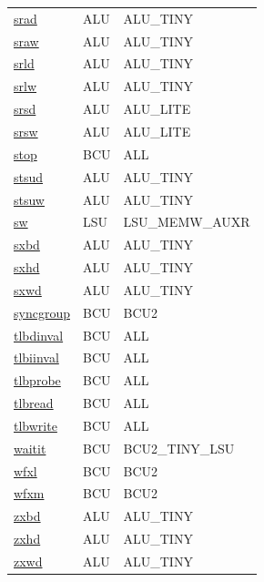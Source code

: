 \begin{small}
\begin{longtable}[l]{l l l}
\hyperlink{lvx.srad}{srad} & ALU & ALU\_TINY \\ 
\hyperlink{lvx.sraw}{sraw} & ALU & ALU\_TINY \\ 
\hyperlink{lvx.srld}{srld} & ALU & ALU\_TINY \\ 
\hyperlink{lvx.srlw}{srlw} & ALU & ALU\_TINY \\ 
\hyperlink{lvx.srsd}{srsd} & ALU & ALU\_LITE \\ 
\hyperlink{lvx.srsw}{srsw} & ALU & ALU\_LITE \\ 
\hyperlink{lvx.stop}{stop} & BCU & ALL \\ 
\hyperlink{lvx.stsud}{stsud} & ALU & ALU\_TINY \\ 
\hyperlink{lvx.stsuw}{stsuw} & ALU & ALU\_TINY \\ 
\hyperlink{lvx.sw}{sw} & LSU & LSU\_MEMW\_AUXR \\ 
\hyperlink{lvx.sxbd}{sxbd} & ALU & ALU\_TINY \\ 
\hyperlink{lvx.sxhd}{sxhd} & ALU & ALU\_TINY \\ 
\hyperlink{lvx.sxwd}{sxwd} & ALU & ALU\_TINY \\ 
\hyperlink{lvx.syncgroup}{syncgroup} & BCU & BCU2 \\ 
\hyperlink{lvx.tlbdinval}{tlbdinval} & BCU & ALL \\ 
\hyperlink{lvx.tlbiinval}{tlbiinval} & BCU & ALL \\ 
\hyperlink{lvx.tlbprobe}{tlbprobe} & BCU & ALL \\ 
\hyperlink{lvx.tlbread}{tlbread} & BCU & ALL \\ 
\hyperlink{lvx.tlbwrite}{tlbwrite} & BCU & ALL \\ 
\hyperlink{lvx.waitit}{waitit} & BCU & BCU2\_TINY\_LSU \\ 
\hyperlink{lvx.wfxl}{wfxl} & BCU & BCU2 \\ 
\hyperlink{lvx.wfxm}{wfxm} & BCU & BCU2 \\ 
\hyperlink{lvx.zxbd}{zxbd} & ALU & ALU\_TINY \\ 
\hyperlink{lvx.zxhd}{zxhd} & ALU & ALU\_TINY \\ 
\hyperlink{lvx.zxwd}{zxwd} & ALU & ALU\_TINY \\ 
\end{longtable}\end{small}
